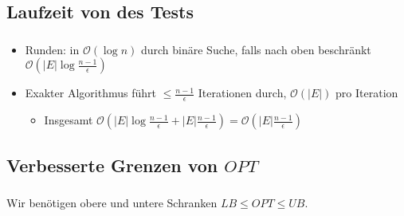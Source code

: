 \documentclass{beamer}
\newcommand{\trianglearrow}{{\tiny\usebeamercolor[bg]{block title} \raisebox{.5ex}{$\blacktriangleright$} }} %
\begin{document}
\subsection{Laufzeit von des Tests}

\begin{frame}
   \frametitle{\insertsection}
   \framesubtitle{\insertsubsection}
   \begin{itemize}
      \item Runden: in $\mathcal{O}(\log{n})$ durch binäre Suche, falls nach
         oben beschränkt \trianglearrow $\mathcal{O}\left(|E|\log{\frac{n-1}{\epsilon}}\right)$
      \item Exakter Algorithmus führt $\le \frac{n-1}{\epsilon}$ Iterationen
         durch, $\mathcal{O}\left(|E|\right)$ pro Iteration
         \begin{itemize}
            \item Insgesamt $\mathcal{O}\left(|E|\log{\frac{n-1}{\epsilon}} + |E|\frac{n-1}{\epsilon}\right) = \mathcal{O}\left(|E|\frac{n-1}{\epsilon}\right)$
         \end{itemize}
   \end{itemize}

\end{frame}

\subsection{Verbesserte Grenzen von $OPT$}

\begin{frame}
   \frametitle{\insertsection}
   \framesubtitle{\insertsubsection}
   Wir benötigen obere und untere Schranken $LB \le OPT \le UB$.
  
\end{frame}
\end{document}

